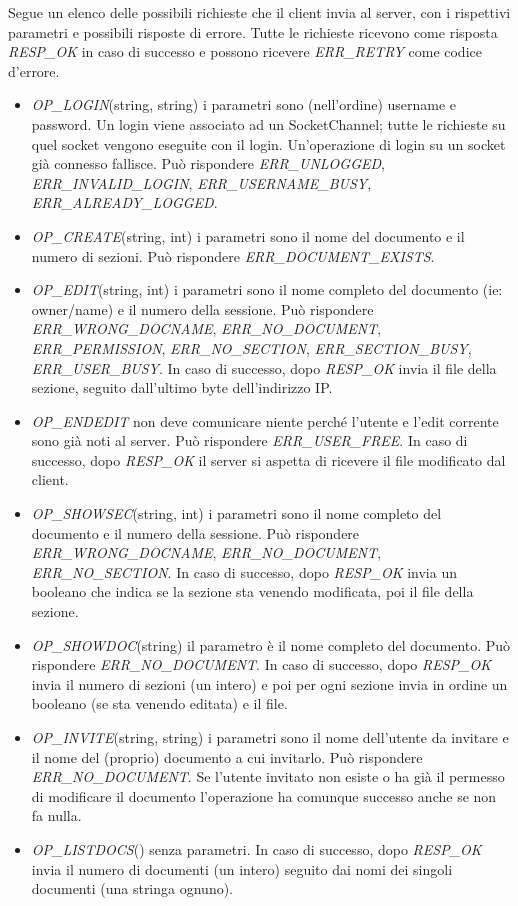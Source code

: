 \documentclass[a4paper]{article}
\theoremstyle{theorem}
\theoremstyle{remark}
\theoremstyle{definition}
\theoremstyle{corollary}
\theoremstyle{lemma}
\begin{document}
Segue un elenco delle possibili richieste che il client invia al server, con i rispettivi parametri e possibili risposte di errore. Tutte le richieste ricevono come risposta \textit{RESP\_OK} in caso di successo e possono ricevere \textit{ERR\_RETRY} come codice d'errore.
\begin{itemize}
	\item \textit{OP\_LOGIN}(string, string) i parametri sono (nell'ordine) username e password. Un login viene associato ad un SocketChannel; tutte le richieste su quel socket vengono eseguite con il login. Un'operazione di login su un socket già connesso fallisce. Può rispondere \textit{ERR\_UNLOGGED}, \textit{ERR\_INVALID\_LOGIN}, \textit{ERR\_USERNAME\_BUSY}, \textit{ERR\_ALREADY\_LOGGED}.
	\item \textit{OP\_CREATE}(string, int) i parametri sono il nome del documento e il numero di sezioni. Può rispondere \textit{ERR\_DOCUMENT\_EXISTS}.
	\item \textit{OP\_EDIT}(string, int) i parametri sono il nome completo del documento (ie: owner/name) e il numero della sessione. Può rispondere \textit{ERR\_WRONG\_DOCNAME}, \textit{ERR\_NO\_DOCUMENT}, \textit{ERR\_PERMISSION}, \textit{ERR\_NO\_SECTION}, \textit{ERR\_SECTION\_BUSY}, \textit{ERR\_USER\_BUSY}. In caso di successo, dopo \textit{RESP\_OK} invia il file della sezione, seguito dall'ultimo byte dell'indirizzo IP.
	\item \textit{OP\_ENDEDIT} non deve comunicare niente perché l'utente e l'edit corrente sono già noti al server. Può rispondere \textit{ERR\_USER\_FREE}. In caso di successo, dopo \textit{RESP\_OK} il server si aspetta di ricevere il file modificato dal client.
	\item \textit{OP\_SHOWSEC}(string, int) i parametri sono il nome completo del documento e il numero della sessione. Può rispondere \textit{ERR\_WRONG\_DOCNAME}, \textit{ERR\_NO\_DOCUMENT}, \textit{ERR\_NO\_SECTION}. In caso di successo, dopo \textit{RESP\_OK} invia un booleano che indica se la sezione sta venendo modificata, poi il file della sezione.
	\item \textit{OP\_SHOWDOC}(string) il parametro è il nome completo del documento. Può rispondere \textit{ERR\_NO\_DOCUMENT}. In caso di successo, dopo \textit{RESP\_OK} invia il numero di sezioni (un intero) e poi per ogni sezione invia in ordine un booleano (se sta venendo editata) e il file.
	\item \textit{OP\_INVITE}(string, string) i parametri sono il nome dell'utente da invitare e il nome del (proprio) documento a cui invitarlo. Può rispondere \textit{ERR\_NO\_DOCUMENT}. Se l'utente invitato non esiste o ha già il permesso di modificare il documento l'operazione ha comunque successo anche se non fa nulla.
	\item \textit{OP\_LISTDOCS}() senza parametri. In caso di successo, dopo \textit{RESP\_OK} invia il numero di documenti (un intero) seguito dai nomi dei singoli documenti (una stringa ognuno).
\end{itemize}
\end{document}
